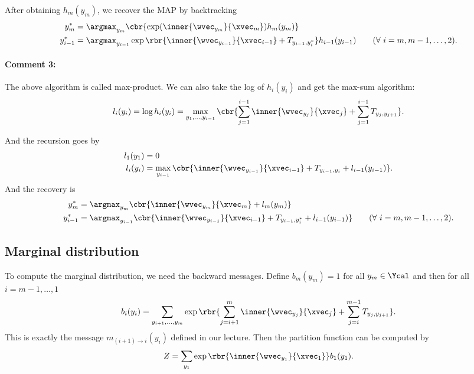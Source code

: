 \documentclass[11pt]{report}
\begin{document}
After obtaining $h_m(y_m)$, we recover the MAP by backtracking
\begin{align}
	y^*_m &= \argmax_{y_m} \cbr{ \exp(\inner{\wvec_{y_m}}{\xvec_m}) h_m(y_m)} \\
	y^*_{i-1} &= \argmax_{y_{i-1}} \exp \rbr{\inner{\wvec_{y_{i-1}}}{\xvec_{i-1}} + T_{y_{i-1}, y^*_i}}  h_{i-1}(y_{i-1})  \qquad (\forall\ i = m, m-1, \ldots, 2).
\end{align}

\paragraph{Comment 3:}
The above algorithm is called max-product.
We can also take the log of $h_i(y_i)$ and get the max-sum algorithm:
\begin{align}
	l_i(y_i) = \log h_i(y_i) = \max_{y_1, \ldots, y_{i-1}} \cbr{\sum_{j=1}^{i-1} \inner{\wvec_{y_j}}{\xvec_j} + \sum_{j=1}^{i-1} T_{y_j, y_{j+1}}}.
\end{align}

And the recursion goes by
\begin{align}
	l_1(y_1) &= 0 \\
	l_i(y_i) &= \max_{y_{i-1}} \cbr{\inner{\wvec_{y_{i-1}}}{\xvec_{i-1}} + T_{y_{i-1}, y_i} + l_{i-1}(y_{i-1})}.
\end{align}
And the recovery is
\begin{align}
	y^*_m &= \argmax_{y_m} \cbr{ \inner{\wvec_{y_m}}{\xvec_m} + l_m(y_m)} \\
	y^*_{i-1} &= \argmax_{y_{i-1}} \cbr{ \inner{\wvec_{y_{i-1}}}{\xvec_{i-1}} + T_{y_{i-1}, y^*_i} + l_{i-1}(y_{i-1})}  \qquad (\forall\ i = m, m-1, \ldots, 2).
\end{align}

\subsection{Marginal distribution}

To compute the marginal distribution, we need the backward messages.
Define $b_m(y_m) = 1$ for all $y_m \in \Ycal$ and then for all $i = m-1, \ldots, 1$
\begin{align}
	b_i(y_i) = \sum_{y_{i+1}, \ldots, y_{m}} \exp \rbr{\sum_{j=i+1}^m \inner{\wvec_{y_j}}{\xvec_j} + \sum_{j=i}^{m-1} T_{y_j, y_{j+1}}}.
\end{align}
This is exactly the message $m_{(i+1) \to i} (y_i)$ defined in our lecture.
Then the partition function can be computed by
\begin{align}
	Z = \sum_{y_1} \exp \rbr{\inner{\wvec_{y_1}}{\xvec_1}} b_1(y_1).
\end{align}
\end{document}
